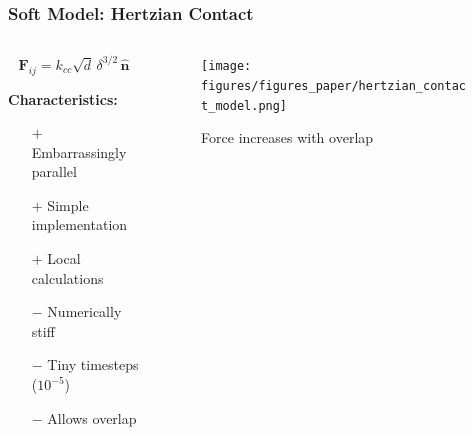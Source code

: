 \documentclass[10pt,t]{beamer}
\begin{document}
\begin{frame}
    \frametitle{Soft Model: Hertzian Contact}

    \begin{columns}
        \begin{column}{0.5\textwidth}
            \begin{equation*}
                \mathbf{F}_{ij} = k_{cc} \sqrt{d} \, \delta^{3/2} \, \hat{\mathbf{n}}
            \end{equation*}

            \vspace{0.3cm}

            \textbf{Characteristics:}
            \begin{itemize}
                \item[$+$] Embarrassingly parallel
                \item[$+$] Simple implementation
                \item[$+$] Local calculations
                \item[$-$] Numerically stiff
                \item[$-$] Tiny timesteps ($10^{-5}$)
                \item[$-$] Allows overlap
            \end{itemize}
        \end{column}

        \begin{column}{0.5\textwidth}
            \begin{figure}
                \centering
                \texttt{[image: figures/figures\_paper/hertzian\_contact\_model.png]}
                \caption*{\scriptsize{Force increases with overlap}}
            \end{figure}
        \end{column}
    \end{columns}

\end{frame}
\end{document}
